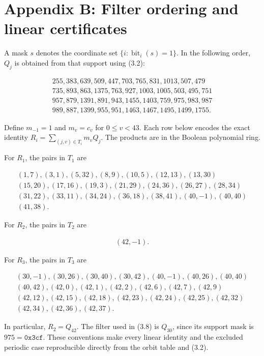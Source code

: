 \documentclass[11pt,a4paper]{article}
\begin{document}
\section*{Appendix B: Filter ordering and linear certificates}

A mask $s$ denotes the coordinate set $\{i: \operatorname{bit}_i(s)=1\}$. In the following order, $Q_j$ is obtained from that support using (3.2):

\[
\begin{gathered}
255,383,639,509,447,703,765,831,1013,507,479 \\
735,893,863,1375,763,927,1003,1005,503,495,751 \\
957,879,1391,891,943,1455,1403,759,975,983,987 \\
989,887,1399,955,951,1463,1467,1495,1499,1755.
\end{gathered}
\]

Define $m_{-1}=1$ and $m_v=c_v$ for $0\le v<43$. Each row below encodes the exact identity $R_i=\sum_{(j,v)\in T_i}m_vQ_j$. The products are in the Boolean polynomial ring.

For $R_1$, the pairs in $T_1$ are

\[
\begin{gathered}
(1,7),(3,1),(5,32),(8,9),(10,5),(12,13),(13,30) \\
(15,20),(17,16),(19,3),(21,29),(24,36),(26,27),(28,34) \\
(31,22),(33,11),(34,24),(36,18),(38,41),(40,-1),(40,40) \\
(41,38).
\end{gathered}
\]

For $R_2$, the pairs in $T_2$ are

\[
\begin{gathered}
(42,-1).
\end{gathered}
\]

For $R_3$, the pairs in $T_3$ are

\[
\begin{gathered}
(30,-1),(30,26),(30,40),(30,42),(40,-1),(40,26),(40,40) \\
(40,42),(42,0),(42,1),(42,2),(42,6),(42,7),(42,9) \\
(42,12),(42,15),(42,18),(42,23),(42,24),(42,25),(42,32) \\
(42,34),(42,36),(42,37).
\end{gathered}
\]

In particular, $R_2=Q_{42}$. The filter used in (3.8) is $Q_{30}$, since its support mask is $975=\mathtt{0x3cf}$. These conventions make every linear identity and the excluded periodic case reproducible directly from the orbit table and (3.2).
\end{document}

